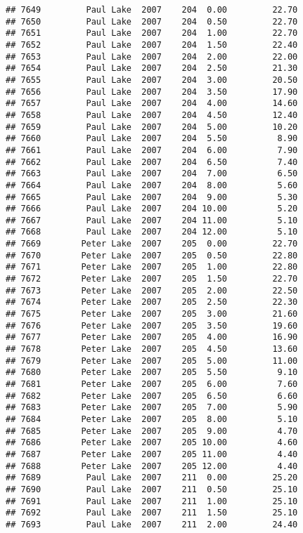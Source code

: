 \documentclass[
]{article}
\begin{document}
\begin{verbatim}
## 7649         Paul Lake  2007    204  0.00         22.70
## 7650         Paul Lake  2007    204  0.50         22.70
## 7651         Paul Lake  2007    204  1.00         22.70
## 7652         Paul Lake  2007    204  1.50         22.40
## 7653         Paul Lake  2007    204  2.00         22.00
## 7654         Paul Lake  2007    204  2.50         21.30
## 7655         Paul Lake  2007    204  3.00         20.50
## 7656         Paul Lake  2007    204  3.50         17.90
## 7657         Paul Lake  2007    204  4.00         14.60
## 7658         Paul Lake  2007    204  4.50         12.40
## 7659         Paul Lake  2007    204  5.00         10.20
## 7660         Paul Lake  2007    204  5.50          8.90
## 7661         Paul Lake  2007    204  6.00          7.90
## 7662         Paul Lake  2007    204  6.50          7.40
## 7663         Paul Lake  2007    204  7.00          6.50
## 7664         Paul Lake  2007    204  8.00          5.60
## 7665         Paul Lake  2007    204  9.00          5.30
## 7666         Paul Lake  2007    204 10.00          5.20
## 7667         Paul Lake  2007    204 11.00          5.10
## 7668         Paul Lake  2007    204 12.00          5.10
## 7669        Peter Lake  2007    205  0.00         22.70
## 7670        Peter Lake  2007    205  0.50         22.80
## 7671        Peter Lake  2007    205  1.00         22.80
## 7672        Peter Lake  2007    205  1.50         22.70
## 7673        Peter Lake  2007    205  2.00         22.50
## 7674        Peter Lake  2007    205  2.50         22.30
## 7675        Peter Lake  2007    205  3.00         21.60
## 7676        Peter Lake  2007    205  3.50         19.60
## 7677        Peter Lake  2007    205  4.00         16.90
## 7678        Peter Lake  2007    205  4.50         13.60
## 7679        Peter Lake  2007    205  5.00         11.00
## 7680        Peter Lake  2007    205  5.50          9.10
## 7681        Peter Lake  2007    205  6.00          7.60
## 7682        Peter Lake  2007    205  6.50          6.60
## 7683        Peter Lake  2007    205  7.00          5.90
## 7684        Peter Lake  2007    205  8.00          5.10
## 7685        Peter Lake  2007    205  9.00          4.70
## 7686        Peter Lake  2007    205 10.00          4.60
## 7687        Peter Lake  2007    205 11.00          4.40
## 7688        Peter Lake  2007    205 12.00          4.40
## 7689         Paul Lake  2007    211  0.00         25.20
## 7690         Paul Lake  2007    211  0.50         25.10
## 7691         Paul Lake  2007    211  1.00         25.10
## 7692         Paul Lake  2007    211  1.50         25.10
## 7693         Paul Lake  2007    211  2.00         24.40

\end{verbatim}
\end{document}
